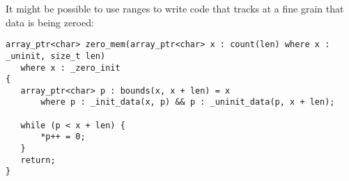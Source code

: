It might be possible to use ranges to write code that tracks at a fine grain that 
data is being zeroed:
\begin{verbatim}
array_ptr<char> zero_mem(array_ptr<char> x : count(len) where x : _uninit, size_t len) 
   where x : _zero_init
{
   array_ptr<char> p : bounds(x, x + len) = x
       where p : _init_data(x, p) && p : _uninit_data(p, x + len);
       
   while (p < x + len) { 
       *p++ = 0;
   }
   return;
}
\end{verbatim}